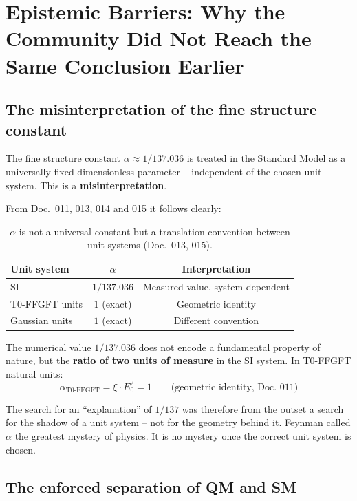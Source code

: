 \section{Epistemic Barriers: Why the Community Did Not Reach the Same Conclusion Earlier}

\subsection{The misinterpretation of the fine structure constant}

The fine structure constant $\alpha \approx 1/137.036$ is treated in
the Standard Model as a universally fixed dimensionless parameter --
independent of the chosen unit system. This is a \textbf{misinterpretation}.

From Doc.~011, 013, 014 and 015 it follows clearly:

\begin{table}[htbp]
\centering
\begin{tabular}{lcc}
\toprule
\textbf{Unit system} & $\alpha$ & \textbf{Interpretation} \\
\midrule
SI                        & $1/137.036$ & Measured value, system-dependent \\
T0-FFGFT units          & $1$ (exact)  & Geometric identity \\
Gaussian units            & $1$ (exact)  & Different convention \\
\bottomrule
\end{tabular}
\caption{$\alpha$ is not a universal constant but a translation
convention between unit systems (Doc.~013, 015).}
\label{tab:alpha_units}
\end{table}

The numerical value $1/137.036$ does not encode a fundamental property
of nature, but the \textbf{ratio of two units of measure} in the SI
system. In T0-FFGFT natural units:
\begin{equation}
    \alpha_{\text{T0-FFGFT}} = \xi \cdot E_0^2 = 1
    \qquad \text{(geometric identity, Doc.~011)}
\end{equation}

The search for an ``explanation'' of $1/137$ was therefore from
the outset a search for the shadow of a unit system -- not for the
geometry behind it. Feynman called $\alpha$ the greatest mystery
of physics. It is no mystery once the correct unit system is chosen.

\subsection{The enforced separation of QM and SM}

